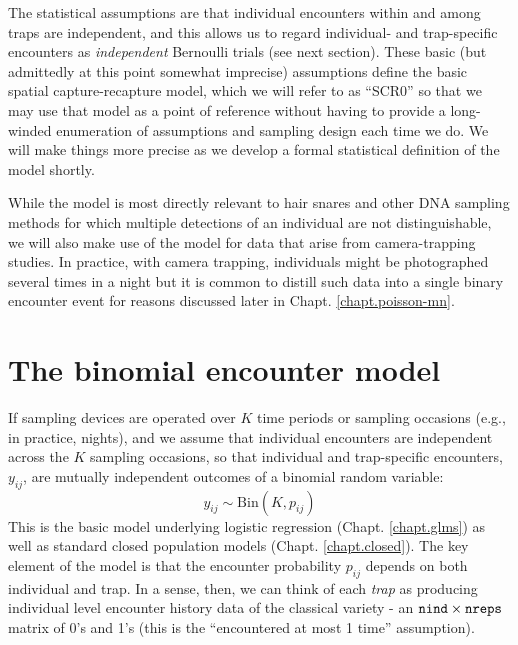 The statistical assumptions are that individual encounters
within and among traps are independent, and this allows us to regard
individual- and trap-specific encounters as {\it independent} Bernoulli trials
(see next section).  These basic (but admittedly at this point
somewhat imprecise) assumptions define the basic spatial
capture-recapture model, which we will refer to as ``SCR0'' 
so that we may use that model as a point of reference without having
to provide a long-winded enumeration of assumptions and sampling
design each time we do. We will make things more precise as we develop
a formal statistical definition of the model shortly.

While the model is most directly relevant
to hair snares and other DNA sampling methods for which multiple
detections of an individual are not distinguishable,
we will also make use of the model for data that arise from
camera-trapping studies. In practice, with camera trapping,
individuals might be photographed several times in a night but it is
common to 
 distill such data into a single binary encounter event for
reasons discussed later in Chapt. \ref{chapt.poisson-mn}.


\section{The binomial encounter model}

If sampling devices are operated over $K$ time periods or sampling
occasions (e.g., in practice,
nights), and we assume that individual encounters are independent
across the $K$ sampling occasions, so that   
 individual and trap-specific encounters, $y_{ij}$,
are mutually independent outcomes of a binomial random variable:
\begin{equation}
	y_{ij} \sim \mbox{Bin}(K, p_{ij})
\label{scr0.eq.bin}
\end{equation}
This is the basic model underlying logistic regression
(Chapt. \ref{chapt.glms}) as well as standard closed population models
(Chapt. \ref{chapt.closed}). The key element of the model is that the
encounter probability $p_{ij}$ depends on both individual and trap. In
a sense, then, we can think of each {\it trap} as producing individual
level encounter history data of the classical variety - an $\mbox{\tt
  nind} \times \mbox{\tt nreps}$ matrix of 0's and 1's (this is the
``encountered at most 1 time'' assumption).


